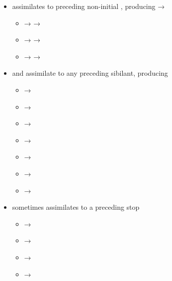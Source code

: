 \begin{itemize}
		\begin{itemize}
			\item {} → 
			\item {} → 
			\item {} → 
			\item {} →  → 
			\item {} →  → 
			\item {} → 
			\item {} → 
			\item {} →  (but also )
			\item {} → 
		\end{itemize}
	\item {} assimilates to preceding non-initial , producing  → 
		\begin{itemize}
			\item {} →  → 
			\item {} →  → 
			\item {} →  → 
		\end{itemize}
	\item {} and  assimilate to any preceding sibilant, producing 
		\begin{itemize}
			\item {} → 
			\item {} → 
			\item {} → 
			\item {} → 
			\item {} → 
			\item {} → 
			\item {} → 
		\end{itemize}
	\item {} sometimes assimilates to a preceding stop
		\begin{itemize}
			\item {} → 
			\item {} → 
			\item {} → 
			\item {} → 
		\end{itemize}
\end{itemize}

